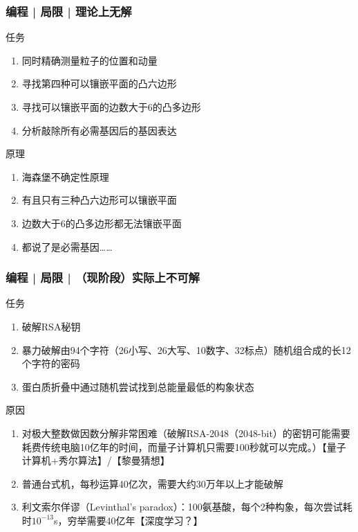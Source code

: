 \begin{frame}
  \frametitle{编程 | 局限 | 理论上无解}
  \begin{block}{任务}
    \begin{enumerate}
      \item<1-> 同时精确测量粒子的位置和动量
      \item<2-> 寻找第四种可以镶嵌平面的凸六边形
      \item<3-> 寻找可以镶嵌平面的边数大于6的凸多边形
      \item<4-> 分析敲除所有必需基因后的基因表达
    \end{enumerate}
  \end{block}
  \begin{block}{原理}
    \begin{enumerate}
      \item<1-> 海森堡不确定性原理
      \item<2-> 有且只有三种凸六边形可以镶嵌平面
      \item<3-> 边数大于6的凸多边形都无法镶嵌平面
      \item<4-> 都说了是必需基因……
    \end{enumerate}
  \end{block}
\end{frame}

\begin{frame}
  \frametitle{编程 | 局限 | （现阶段）实际上不可解}
  \begin{block}{任务}
    \begin{enumerate}
      \item<1-> 破解RSA秘钥
      \item<2-> 暴力破解由94个字符（26小写、26大写、10数字、32标点）随机组合成的长12个字符的密码
      \item<3-> 蛋白质折叠中通过随机尝试找到总能量最低的构象状态
    \end{enumerate}
  \end{block}
  \begin{block}{原因}
    \begin{enumerate}
      \item<1-> 对极大整数做因数分解非常困难（破解RSA-2048（2048-bit）的密钥可能需要耗费传统电脑10亿年的时间，而量子计算机只需要100秒就可以完成。）【量子计算机+秀尔算法】/【黎曼猜想】
      \item<2-> 普通台式机，每秒运算40亿次，需要大约30万年以上才能破解
      \item<3-> 利文索尔佯谬（Levinthal's paradox）：100氨基酸，每个2种构象，每次尝试耗时$10^{-13}$s，穷举需要40亿年【深度学习？】
    \end{enumerate}
  \end{block}
\end{frame}

